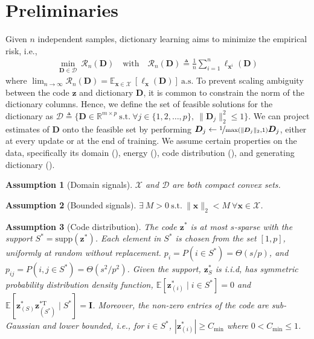 \documentclass[10pt]{article} %
\newtheorem{assumption}{Assumption}[section]
\newcommand{\R}{\mathbb{R}} %
\newcommand{\E}{\mathbb{E}} %
\newcommand{\D}{{\bm D}}
\newcommand{\eye}{{\bm I}}
\newcommand{\x}{{\bm x}}
\newcommand{\z}{{\bm z}}
\newcommand{\loss}{\ell}
\newcommand{\risk}{\mathcal{R}}
\newcommand{\X}{\mathcal{X}}
\newcommand{\Dcal}{\mathcal{D}}
\begin{document}
\section{Preliminaries}\label{sec:prelim}
%
Given $n$ independent samples, dictionary learning aims to minimize the empirical risk, i.e.,
\begin{equation}\label{eq:erm}
\begin{array}{c}
\min_{\D \in \Dcal}\ \risk_n(\D)\quad \text{with}\quad  \risk_n(\D) \triangleq \frac{1}{n} \sum_{i=1}^n \loss_{\x^i}(\D)
\end{array}
\end{equation}
where $\lim_{n \to \infty} \risk_n(\D) = \E_{\x \in \X}\ [\loss_{\x}(\D)]\ \text{a.s.}$ To prevent scaling ambiguity between the code $\z$ and dictionary $\D$, it is common to constrain the norm of the dictionary columns. Hence, we define the set of feasible solutions for the dictionary as $\Dcal \triangleq \{ \D \in \R^{m \times p}\ \text{s.t.}\ \forall j\in \{1,2,\ldots,p\},\ \| \D_j \|_2^2 \leq 1 \}$. We can project estimates of $\D$ onto the feasible set by performing $\D_j \leftarrow \nicefrac{1}{\max (\| \D_j \|_2, 1)} \D_j$, either at every update or at the end of training. We assume certain properties on the data, specifically its domain (), energy (), code distribution (), and generating dictionary ().
%
\begin{assumption}[Domain signals]\label{assum:domain}
$\X$ and $\Dcal$ are both compact convex sets.
\end{assumption}
%
\begin{assumption}[Bounded signals]\label{assum:boundx}
$\exists\ M > 0\ \text{s.t.}\ \| \x \|_2 < M\  \forall \x \in \X$.
\end{assumption}
%
\begin{assumption}[Code distribution]\label{assum:distz}
The code $\z^{\ast}$ is at most $s$-sparse with the support $S^{\ast} = \text{supp}(\z^{\ast})$. Each element in $S^{\ast}$ is chosen from the set $[1, p]$, uniformly at random without replacement. $p_i = P(i \in S^{\ast}) = \Theta(s/p)$, and $p_{ij} = P(i,j \in S^{\ast}) = \Theta(s^2/p^2)$. Given the support, $\z_S^{\ast}$ is i.i.d, has symmetric probability distribution density function, $\E[\z_{(i)}^{\ast} \mid i \in S^{\ast}] = 0$ and $\E[\z_{(S)}^{\ast} \z_{(S^{\ast})}^{\ast \text{T}} \mid S^{\ast}] = \eye$. Moreover, the non-zero entries of the code are sub-Gaussian and lower bounded, i.e., for $i \in S^{\ast}$, $| \z_{(i)}^{\ast} | \geq C_{\min}$ where $0 < C_{\min} \leq 1$.
\end{assumption}
\end{document}
